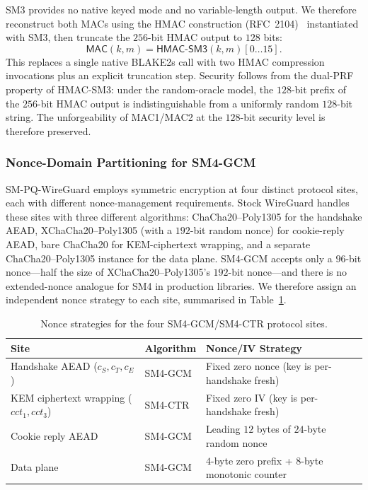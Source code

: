 \documentclass{SCIS2026}
\begin{document}
SM3 provides no native keyed mode and no variable-length output.
We therefore reconstruct both MACs using the HMAC construction
(RFC~2104)~\cite{30} instantiated with SM3, then truncate
the $256$-bit HMAC
output to $128$ bits:
\[
\textsf{MAC}(k, m) = \textsf{HMAC-SM3}(k, m)[0\ldots 15].
\]
This replaces a single native BLAKE2s call with two HMAC compression
invocations plus an explicit truncation step.  Security follows from
the dual-PRF property of HMAC-SM3: under the random-oracle model,
the $128$-bit prefix of the $256$-bit HMAC output is
indistinguishable from a uniformly random $128$-bit string.  The
unforgeability of MAC1/MAC2 at the $128$-bit security level is
therefore preserved.

\subsubsection{Nonce-Domain Partitioning for SM4-GCM}
\label{sec:noncedomain}

SM-PQ-WireGuard employs symmetric encryption at four distinct
protocol sites, each with different nonce-management requirements.
Stock WireGuard handles these sites with three different algorithms:
ChaCha20--Poly1305 for the handshake AEAD,
XChaCha20--Poly1305 (with a $192$-bit random nonce) for cookie-reply
AEAD, bare ChaCha20 for KEM-ciphertext wrapping, and a separate
ChaCha20--Poly1305 instance for the data plane.  SM4-GCM accepts
only a $96$-bit nonce---half the size of XChaCha20--Poly1305's
$192$-bit nonce---and there is no extended-nonce analogue for SM4 in
production libraries.  We therefore assign an independent nonce
strategy to each site, summarised in Table~\ref{tab:nonces}.

\begin{table}[htbp]
\centering
\caption{Nonce strategies for the four SM4-GCM/SM4-CTR protocol sites.}
\label{tab:nonces}
\footnotesize
\tabcolsep 8pt
\begin{tabular}{lll}
\toprule
\textbf{Site} & \textbf{Algorithm} & \textbf{Nonce/IV Strategy} \\
\midrule
Handshake AEAD ($c_S, c_T, c_E$) & SM4-GCM & Fixed zero nonce (key is per-handshake fresh) \\
KEM ciphertext wrapping ($\textit{cct}_1, \textit{cct}_3$) & SM4-CTR & Fixed zero IV (key is per-handshake fresh) \\
Cookie reply AEAD & SM4-GCM & Leading $12$ bytes of $24$-byte random nonce \\
Data plane & SM4-GCM & $4$-byte zero prefix + $8$-byte monotonic counter \\
\bottomrule
\end{tabular}
\end{table}
\end{document}
